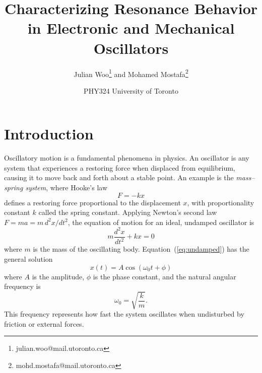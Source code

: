 \documentclass[
	a4paper, %
	10pt, %
	twoside, %
]{journal}
\title{\textcolor{bluehead}{Characterizing Resonance Behavior in Electronic and Mechanical Oscillators}} %
\author{%
    Julian Woo\thanks{julian.woo@mail.utoronto.ca}  \; and Mohamed Mostafa\thanks{mohd.mostafa@mail.utoronto.ca}
}
\date{\small PHY324 University of Toronto}
\begin{document}
\maketitle %




\section{Introduction}


Oscillatory motion is a fundamental phenomena in physics. An oscillator is any system that experiences a restoring force when displaced from equilibrium, causing it to move back and forth about a stable point. An example is the \textit{mass--spring system}, where Hooke’s law 
\begin{equation}
F = -kx
\end{equation}
defines a restoring force proportional to the displacement $x$, with proportionality constant $k$ called the spring constant. Applying Newton’s second law $F = ma = m\,d^2x/dt^2$, the equation of motion for an ideal, undamped oscillator is 
\begin{equation}
m\frac{d^2x}{dt^2} + kx = 0
\label{eq:undamped}
\end{equation}
where $m$ is the mass of the oscillating body. Equation~(\ref{eq:undamped}) has the general solution 
\begin{equation}
x(t) = A\cos(\omega_0 t + \phi)
\end{equation}
where $A$ is the amplitude, $\phi$ is the phase constant, and the natural angular frequency is 
\begin{equation}
\omega_0 = \sqrt{\frac{k}{m}}.
\end{equation}
This frequency represents how fast the system oscillates when undisturbed by friction or external forces.  
\end{document}
